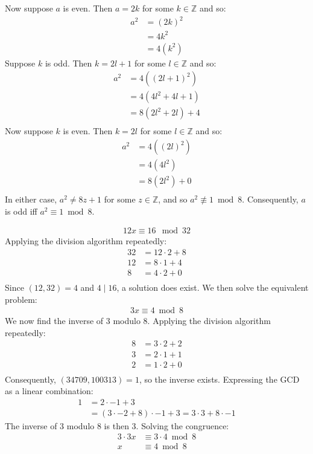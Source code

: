 \documentclass{article}
\begin{document}
Now suppose $a$ is even. Then $a = 2k$ for some $k \in \mathbb{Z}$ and so:
\begin{align*}
    a^2 & = {(2k)}^2 \\
    & = 4k^2 \\
    & = 4(k^2)
\end{align*}
Suppose $k$ is odd. Then $k = 2l + 1$ for some $l \in \mathbb{Z}$ and so:
\begin{align*}
    a^2 & = 4({(2l + 1)}^2) \\
    & = 4(4l^2 + 4l + 1)\\
    & = 8(2l^2 + 2l) + 4 \\
\end{align*}
Now suppose $k$ is even. Then $k = 2l$ for some $l \in \mathbb{Z}$ and so:
\begin{align*}
    a^2 & = 4({(2l)}^2) \\
    & = 4(4l^2)\\
    & = 8(2l^2) + 0 \\
\end{align*}
In either case, $a^2 \neq 8z + 1$ for some $z \in \mathbb{Z}$, and so $a^2 \not\equiv 1 \bmod 8$. Consequently, $a$ is odd iff $a^2 \equiv 1 \bmod 8$.

\clearpage
\problem{}
\begin{align*}
    12x \equiv 16 \mod 32
\end{align*}
Applying the division algorithm repeatedly:
\begin{align*}
    32 & = 12 \cdot 2 + 8 \\
    12 & = 8 \cdot 1 + 4 \\
    8 & = 4 \cdot 2 + 0 \\
\end{align*}
Since $(12, 32) = 4$ and $4 \mid 16$, a solution does exist. We then solve the equivalent problem:
\begin{align*}
    3x \equiv 4 \bmod 8
\end{align*}
We now find the inverse of $3$ modulo $8$. Applying the division algorithm repeatedly:
\begin{align*}
    8 & = 3 \cdot 2 + 2 \\
    3 & = 2 \cdot 1 + 1 \\
    2 & = 1 \cdot 2 + 0 \\
\end{align*}
Consequently, $(34709, 100313) = 1$, so the inverse exists. Expressing the GCD as a linear combination:
\begin{align*}
    1 & = 2 \cdot -1 + 3 \\
    & = (3 \cdot -2 + 8) \cdot -1 + 3 = 3 \cdot 3 + 8 \cdot -1
\end{align*}
The inverse of $3$ modulo $8$ is then $3$. Solving the congruence:
\begin{align*}
    3 \cdot 3x & \equiv 3 \cdot 4 \bmod 8 \\
    x & \equiv 4 \bmod 8 
\end{align*}
\end{document}
